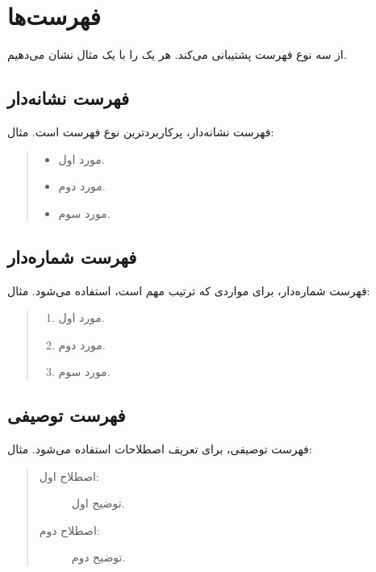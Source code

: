 \section{فهرست‌ها}
\label{sec:text-lists}

 از سه نوع فهرست پشتیبانی می‌کند.
هر یک را با یک مثال نشان می‌دهیم.

\subsection{فهرست نشانه‌دار}

فهرست نشانه‌دار، پرکاربردترین نوع فهرست است.
مثال:

\begin{quote}
    \begin{itemize}
        \item مورد اول.
        \item مورد دوم.
        \item مورد سوم.
    \end{itemize}
\end{quote}


\subsection{فهرست شماره‌دار}

فهرست شماره‌دار، برای مواردی که ترتیب مهم
است، استفاده می‌شود. مثال:

\begin{quote}
    \begin{enumerate}
        \item مورد اول.
        \item مورد دوم.
        \item مورد سوم.
    \end{enumerate}
\end{quote}


\subsection{فهرست توصیفی}

فهرست توصیفی، برای تعریف اصطلاحات استفاده
می‌شود. مثال:

\begin{quote}
    \begin{description}
        \item[اصطلاح اول:] توضیح اول.
        \item[اصطلاح دوم:] توضیح دوم.
    \end{description}
\end{quote}

